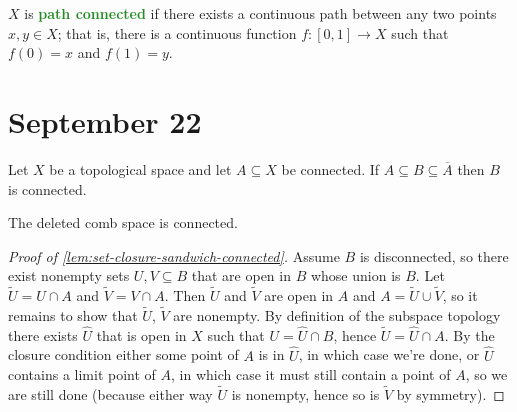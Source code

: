 \documentclass[11pt]{scrartcl}
\providecommand{\ol}{\overline}
\providecommand{\vocab}[1]{{\textbf{\textcolor{ForestGreen}{#1}}}}
\begin{document}
\begin{definition}
    \label{def:path-connected}
    $X$ is \vocab{path connected} if there exists a continuous path
    between any two points $x,y\in X$; that is, there is a continuous function
    $f\colon[0,1]\to X$ such that $f(0)=x$ and $f(1)=y$.
\end{definition}

\begin{prop}
    \label{prop:path-conn-impiles-conn}
    
\end{prop}


\section{September 22}\label{sec:sep22}

\begin{lemma}
    \label{lem:set-closure-sandwich-connected}
    Let $X$ be a topological space and let $A\subseteq X$ be connected.
    If $A\subseteq B\subseteq\ol A$ then $B$ is connected.
\end{lemma}

\begin{corollary}
    \label{coro:deleted-comb-space-connected}
    The deleted comb space is connected.
\end{corollary}

\begin{proof}[Proof of \autoref{lem:set-closure-sandwich-connected}]
    Assume $B$ is disconnected, so there exist nonempty sets
    $U,V\subseteq B$ that are open in $B$ whose union is $B$.
    Let $\widetilde U = U\cap A$ and $\widetilde V = V\cap A$.
    Then $\widetilde U$ and $\widetilde V$ are open in $A$
    and $A = \widetilde U\cup\widetilde V$, so it remains to show that
    $\widetilde U$, $\widetilde V$ are nonempty.
    By definition of the subspace topology there exists
    $\widehat U$ that is open in $X$ such that $U = \widehat U\cap B$,
    hence $\widetilde U = \widehat U\cap A$. By the closure condition
    either some point of $A$ is in $\widehat U$, in which case we're done,
    or $\widehat U$ contains a limit point of $A$, in which case
    it must still contain a point of $A$, so we are still done
    (because either way $\widetilde U$ is nonempty,
    hence so is $\widetilde V$ by symmetry).
\end{proof}
\end{document}
